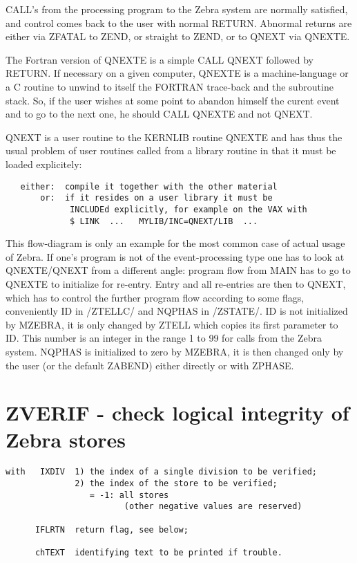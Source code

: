 CALL's from the processing program to the Zebra system
are normally satisfied,
and control comes back to the user with normal RETURN.
Abnormal returns are either via ZFATAL to ZEND,
or straight to ZEND,
or to QNEXT via QNEXTE.


The Fortran version of QNEXTE is a simple CALL QNEXT
followed by RETURN.
If necessary on a given computer,
QNEXTE is a machine-language or a C routine to unwind to itself
the FORTRAN trace-back and the subroutine stack.
So, if the user wishes at some point to abandon himself
the curent event and to go to the next one,
he should CALL QNEXTE and not QNEXT.

QNEXT is a user routine to the KERNLIB routine QNEXTE and
has thus the usual problem of user routines called
from a library routine in that it must be loaded explicitely:
\begin{verbatim}
   either:  compile it together with the other material
       or:  if it resides on a user library it must be
             INCLUDEd explicitly, for example on the VAX with
             $ LINK  ...   MYLIB/INC=QNEXT/LIB  ...
\end{verbatim} 

This flow-diagram is only an example for the most common case
of actual usage of Zebra.
If one's program is not of the event-processing type
one has to look at QNEXTE/QNEXT from a different angle:
program flow from MAIN has to go to QNEXTE to initialize
for re-entry.
Entry and all re-entries are then to QNEXT,
which has to control the further program flow according
to some flags,
conveniently ID in /ZTELLC/ and NQPHAS in /ZSTATE/.
ID is not initialized by MZEBRA,
it is only changed by ZTELL which copies its first parameter to ID.
This number is an integer in the range 1 to 99 for calls
from the Zebra system.
NQPHAS is initialized to zero by MZEBRA,
it is then changed only by the user (or the default ZABEND)
either directly or with ZPHASE.

\section{ZVERIF - check logical integrity of Zebra stores}


\begin{verbatim}
with   IXDIV  1) the index of a single division to be verified;
              2) the index of the store to be verified;
                 = -1: all stores
                        (other negative values are reserved)

      IFLRTN  return flag, see below;

      chTEXT  identifying text to be printed if trouble.
\end{verbatim} 

